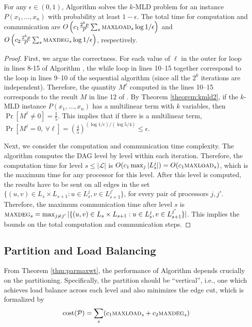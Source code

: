 \begin{theorem}
\label{thm:parmaxwt}
For any $\epsilon\in(0, 1)$,
Algorithm \parmaxwt{} solves the \textsc{$k$-MLD} problem for an
instance $P(x_1,\ldots,x_n)$ with probability at least $1-\epsilon$. The total time for
computation and communication are $O\left(c_1\frac{2^kp}{P}\sum_s \textsc{maxload}{}_s\log{1/\epsilon}\right)$ 
and $O\left(c_2\frac{2^kp}{P}\sum_s \textsc{maxdeg}{}_s\log{1/\epsilon}\right)$, respectively.
\end{theorem}
\begin{proof}
First, we argue the correctness.
For each value of $\ell$ in the outer for loop in lines 8-15 of Algorithm \parmaxwt{},
the while loop in lines 10--15 together correspond to the loop in lines 9--10
of the sequential algorithm \maxwt{} (since all the $2^k$ iterations are independent).
Therefore, the quantity $M^{\ell}$ computed in the lines 10--15 corresponds to the
result $M$ in line 12 of \maxwt{}. By Theorem \ref{theorem:kmld2}, if the
\textsc{$k$-MLD} instance $P(x_1,\ldots,x_n)$ has a multilinear term with $k$ variables,
then $\Pr[M^{\ell}\neq 0] = \frac{1}{5}$. This implies that if there is a multilinear term,
$\Pr[M^{\ell} = 0,\ \forall \ell] = (\frac{4}{5})^{(\log{1/\epsilon})/(\log{5/4})}\leq\epsilon$.

Next, we consider the computation and communication time complexity. 
The algorithm \parcircuit{} computes the DAG level by level within each iteration.
Therefore, the computation time for level $s\leq |\mathcal{L}|$ is 
$O(c_1\max_j |L_s^j|) = O(c_1\textsc{maxload}{}_s)$, which is the maximum time for any processor
for this level. After this level is computed, the results have to be sent on all edges
in the set 
$\{(u, v)\in L_s\times L_{s+1}: u\in L_s^j, v\in L_{s+1}^{j'}\}$, for every pair of
processors $j, j'$. Therefore, the maximum communication time after level $s$ is
$\textsc{maxdeg}{}_s = \max_{j\neq j'} |\{(u, v)\in L_s\times L_{s+1}: u\in L_s^j, v\in L_{s+1}^{j'}\}|$.
This implies the bounds on the total computation and communication steps.
\end{proof}

\subsection{Partition and Load Balancing}
\label{sec:partition}

From Theorem \ref{thm:parmaxwt}, the performance of Algorithm \parmaxwt{} depends crucially
on the partitioning. Specifically, the partition should be ``vertical'', i.e., one which achieves
load balance across each level and also minimizes the edge cut, which is formalized by
\[
\text{cost}(\mathcal{P}) = \sum_s (c_1\textsc{maxload}{}_s + c_2\textsc{maxdeg}{}_s)
\]

